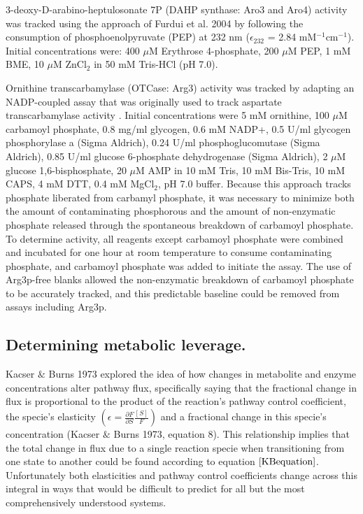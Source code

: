 \documentclass[12pt]{nature}\usepackage{graphicx, color}
\begin{document}
3-deoxy-D-arabino-heptulosonate 7P (DAHP synthase: Aro3 and Aro4) activity was tracked using the approach of Furdui et al. 2004 \cite{Furdui:2004bk} by following the consumption of phosphoenolpyruvate (PEP) at 232 nm ($\epsilon_{232}$ = 2.84 mM$^{-1}$cm$^{-1}$). Initial concentrations were: 400 $\mu$M Erythrose 4-phosphate, 200 $\mu$M PEP, 1 mM BME, 10 $\mu$M ZnCl$_{2}$ in 50 mM Tris-HCl (pH 7.0).  

Ornithine transcarbamylase (OTCase: Arg3) activity was tracked by adapting an NADP-coupled assay that was originally used to track aspartate transcarbamylase activity \cite{Foote:1981to}. Initial concentrations were 5 mM ornithine, 100 $\mu$M carbamoyl phosphate, 0.8 mg/ml glycogen, 0.6 mM NADP+, 0.5 U/ml glycogen phosphorylase a (Sigma Aldrich), 0.24 U/ml phosphoglucomutase (Sigma Aldrich), 0.85 U/ml glucose 6-phosphate dehydrogenase (Sigma Aldrich), 2 $\mu$M glucose 1,6-bisphosphate, 20 $\mu$M AMP in 10 mM Tris, 10 mM Bis-Tris, 10 mM CAPS, 4 mM DTT, 0.4 mM MgCl$_{2}$, pH 7.0 buffer.  Because this approach tracks phosphate liberated from carbamyl phosphate, it was necessary to minimize both the amount of contaminating phosphorous and the amount of non-enzymatic phosphate released through the spontaneous breakdown of carbamoyl phosphate.  To determine activity, all reagents except carbamoyl phosphate were combined and incubated for one hour at room temperature to consume contaminating phosphate, and carbamoyl phosphate was added to initiate the assay.  The use of Arg3p-free blanks allowed the non-enzymatic breakdown of carbamoyl phosphate to be accurately tracked, and this predictable baseline could be removed from assays including Arg3p. 

\subsection{Determining metabolic leverage.}

Kacser $\&$ Burns 1973 \cite{main-Kacser:1973fe} explored the idea of how changes in metabolite and enzyme concentrations alter pathway flux, specifically saying that the fractional change in flux is proportional to the product of the reaction's pathway control coefficient, the specie's elasticity $\left(\epsilon = \frac{\partial F}{\partial S}\frac{[S]}{F}\right)$ and a fractional change in this specie's concentration (Kacser $\&$ Burns 1973, equation 8).  This relationship implies that the total change in flux due to a single reaction specie when transitioning from one state to another could be found according to equation $\ref{KBequation}$.  Unfortunately both elasticities and pathway control coefficients change across this integral in ways that would be difficult to predict for all but the most comprehensively understood systems.
\end{document}
